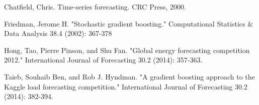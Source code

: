 \documentclass{article} %
\begin{document}

Chatfield, Chris. Time-series forecasting. CRC Press, 2000.

Friedman, Jerome H. "Stochastic gradient boosting." Computational Statistics \& Data Analysis 38.4 (2002): 367-378

Hong, Tao, Pierre Pinson, and Shu Fan. "Global energy forecasting competition 2012." International Journal of Forecasting 30.2 (2014): 357-363.

Taieb, Souhaib Ben, and Rob J. Hyndman. "A gradient boosting approach to the Kaggle load forecasting competition." International Journal of Forecasting 30.2 (2014): 382-394.
\end{document}
